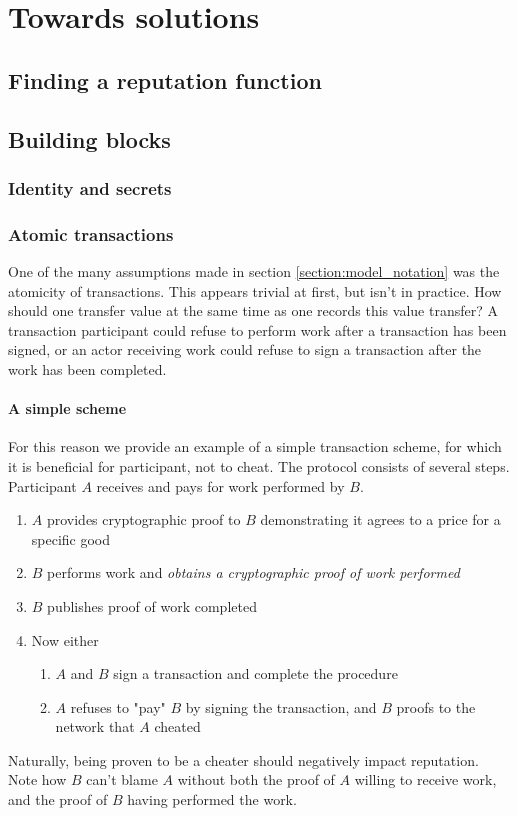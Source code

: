 \chapter{Towards solutions}
\section{Finding a reputation function}

\section{Building blocks}
\subsection{Identity and secrets}

\subsection{Atomic transactions}
One of the many assumptions made in section \ref{section:model_notation} was the atomicity of transactions. This appears trivial at first, but isn't in practice. How should one transfer value at the same time as one records this value transfer? A transaction participant could refuse to perform work after a transaction has been signed, or an actor receiving work could refuse to sign a transaction after the work has been completed.

\subsubsection{A simple scheme}
For this reason we provide an example of a simple transaction scheme, for which it is beneficial for participant, not to cheat. The protocol consists of several steps. Participant $A$ receives and pays for work performed by $B$.
\begin{enumerate}
	\item $A$ provides cryptographic proof to $B$ demonstrating it agrees to a price for a specific good
	\item \label{atomic_transactions_enumerate_proof_of_work}$B$ performs work and \emph{obtains a cryptographic proof of work performed}
	\item $B$ publishes proof of work completed
	\item Now either 
	\begin{enumerate}
		\item $A$ and $B$ sign a transaction and complete the procedure
		\item $A$ refuses to "pay" $B$ by signing the transaction, and $B$ proofs to the network that $A$ cheated
	\end{enumerate}
\end{enumerate}
Naturally, being proven to be a cheater should negatively impact reputation. Note how $B$ can't blame $A$ without both the proof of $A$ willing to receive work, and the proof of $B$ having performed the work.

